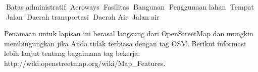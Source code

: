 Batas administratif
Aeroways
Fasilitas
Bangunan
Penggunaan lahan
Tempat
Jalan
Daerah transportasi
Daerah Air
Jalan air

Penamaan untuk lapisan ini berasal langsung dari OpenStreetMap dan mungkin membingungkan jika Anda tidak terbiasa dengan tag OSM.
Berikut informasi lebih lanjut tentang bagaimana tag bekerja: http://wiki.openstreetmap.org/wiki/Map\_Features.

